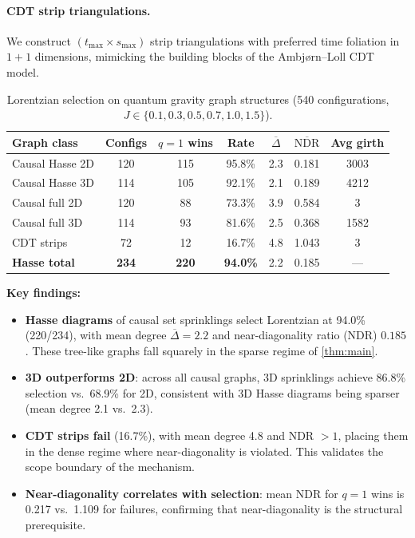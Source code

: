 \documentclass[11pt]{article}
\theoremstyle{definition}
\theoremstyle{remark}
\begin{document}
\paragraph{CDT strip triangulations.}
We construct $(t_{\max} \times s_{\max})$ strip triangulations with preferred
time foliation in $1{+}1$ dimensions, mimicking the building blocks of the
Ambj{\o}rn--Loll CDT model.

\begin{table}[htbp]
\centering
\caption{Lorentzian selection on quantum gravity graph structures
(540 configurations, $J \in \{0.1, 0.3, 0.5, 0.7, 1.0, 1.5\}$).}
\label{tab:causal-set}
\begin{tabular}{@{}lcccccc@{}}
\toprule
Graph class & Configs & $q{=}1$ wins & Rate & $\overline{\Delta}$ &
  $\overline{\mathrm{NDR}}$ & Avg girth \\
\midrule
Causal Hasse 2D & 120 & 115 & 95.8\% & 2.3 & 0.181 & 3003 \\
Causal Hasse 3D & 114 & 105 & 92.1\% & 2.1 & 0.189 & 4212 \\
Causal full 2D & 120 & 88 & 73.3\% & 3.9 & 0.584 & 3 \\
Causal full 3D & 114 & 93 & 81.6\% & 2.5 & 0.368 & 1582 \\
CDT strips & 72 & 12 & 16.7\% & 4.8 & 1.043 & 3 \\
\midrule
\textbf{Hasse total} & \textbf{234} & \textbf{220} & \textbf{94.0\%} & 2.2 & 0.185 & --- \\
\bottomrule
\end{tabular}
\end{table}

\noindent\textbf{Key findings:}
\begin{itemize}
\item \textbf{Hasse diagrams} of causal set sprinklings select Lorentzian at
  94.0\% (220/234), with mean degree $\overline{\Delta} = 2.2$ and
  near-diagonality ratio (NDR) $0.185$. These tree-like graphs fall squarely in
  the sparse regime of \cref{thm:main}.
\item \textbf{3D outperforms 2D}: across all causal graphs, 3D sprinklings
  achieve 86.8\% selection vs.\ 68.9\% for 2D, consistent with 3D Hasse
  diagrams being sparser (mean degree 2.1 vs.\ 2.3).
\item \textbf{CDT strips fail} (16.7\%), with mean degree 4.8 and NDR $> 1$,
  placing them in the dense regime where near-diagonality is violated.
  This validates the scope boundary of the mechanism.
\item \textbf{Near-diagonality correlates with selection}: mean NDR for
  $q{=}1$ wins is 0.217 vs.\ 1.109 for failures, confirming that
  near-diagonality is the structural prerequisite.
\end{itemize}
\end{document}
